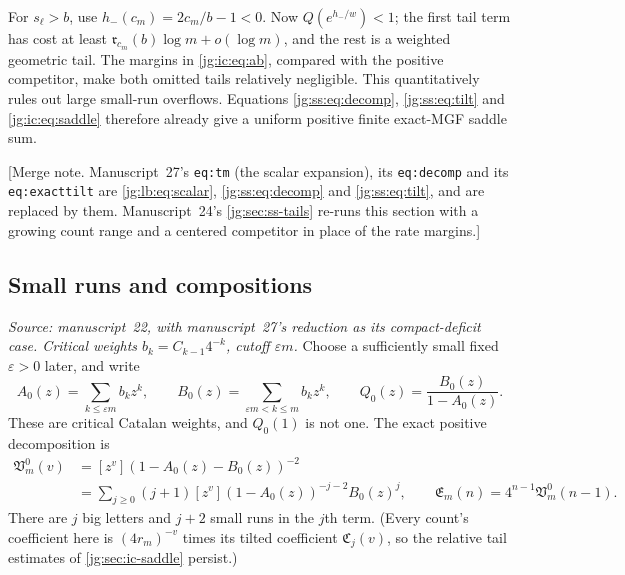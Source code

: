 \documentclass[11pt,a4paper]{article}
\theoremstyle{definition}\newaliascnt{definition}{theorem}
\theoremstyle{remark}\newaliascnt{remark}{theorem}
\begin{document}
For $s_\ell>b$, use $h_-(c_m)=2c_m/b-1<0$. Now $Q(e^{h_-/w})<1$; the first tail
term has cost at least $\mathfrak r_{c_m}(b)\log m+o(\log m)$, and the rest is a
weighted geometric tail. The margins in \eqref{jg:ic:eq:ab}, compared with the
positive competitor, make both omitted tails relatively negligible. This
quantitatively rules out large small-run overflows. Equations
\eqref{jg:ss:eq:decomp}, \eqref{jg:ss:eq:tilt} and \eqref{jg:ic:eq:saddle}
therefore already give a uniform positive finite exact-MGF saddle sum.

[Merge note. Manuscript~27's \texttt{eq:tm} (the scalar expansion), its
\texttt{eq:decomp} and its \texttt{eq:exacttilt} are \eqref{jg:lb:eq:scalar},
\eqref{jg:ss:eq:decomp} and \eqref{jg:ss:eq:tilt}, and are replaced by them.
Manuscript~24's \cref{jg:sec:ss-tails} re-runs this section with a growing
count range and a centered competitor in place of the rate margins.]

\subsection{Small runs and compositions}
\label{jg:sec:gm-comp}
\emph{Source: manuscript~22, with manuscript~27's reduction as its
compact-deficit case. Critical weights $b_k=C_{k-1}4^{-k}$, cutoff
$\varepsilon m$.} Choose a sufficiently small fixed $\varepsilon>0$ later, and
write
\begin{equation}\label{jg:gm:eq:split}
 A_0(z)=\sum_{k\le\varepsilon m}b_kz^k,\qquad
 B_0(z)=\sum_{\varepsilon m<k\le m}b_kz^k,\qquad
 Q_0(z)=\frac{B_0(z)}{1-A_0(z)}.
\end{equation}
These are critical Catalan weights, and $Q_0(1)$ is not one. The exact positive
decomposition is
\begin{equation}\label{jg:gm:eq:decomp}
 \begin{split}
 \mathfrak V^0_m(v)&=[z^v](1-A_0(z)-B_0(z))^{-2}\\
 &=\sum_{j\ge0}(j+1)[z^v](1-A_0(z))^{-j-2}B_0(z)^j,\qquad
 \mathfrak E_m(n)=4^{n-1}\mathfrak V^0_m(n-1).
 \end{split}
\end{equation}
There are $j$ big letters and $j+2$ small runs in the $j$th term. (Every count's
coefficient here is $(4r_m)^{-v}$ times its tilted coefficient
$\mathfrak C_j(v)$, so the relative tail estimates of
\cref{jg:sec:ic-saddle} persist.)
\end{document}
